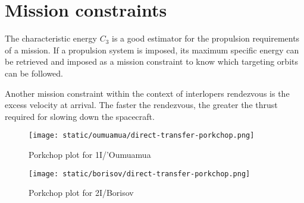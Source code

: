 \section{Mission constraints}

The characteristic energy $C_3$ is a good estimator for the propulsion
requirements of a mission. If a propulsion system is imposed, its maximum
specific energy can be retrieved and imposed as a mission constraint to know
which targeting orbits can be followed.

Another mission constraint within the context of interlopers rendezvous is the
excess velocity at arrival. The faster the rendezvous, the greater the thrust
required for slowing down the spacecraft.

\newpage
\begin{figure}[H]
  \centering
  \texttt{[image: static/oumuamua/direct-transfer-porkchop.png]}
  \caption{Porkchop plot for 1I/'Oumuamua}
  \label{fig:oumuamua-direct-transfer-porkchop}
\end{figure}

\newpage
\begin{figure}[H]
  \centering
  \texttt{[image: static/borisov/direct-transfer-porkchop.png]}
  \caption{Porkchop plot for 2I/Borisov}
  \label{fig:borisov-direct-transfer-porkchop}
\end{figure}
